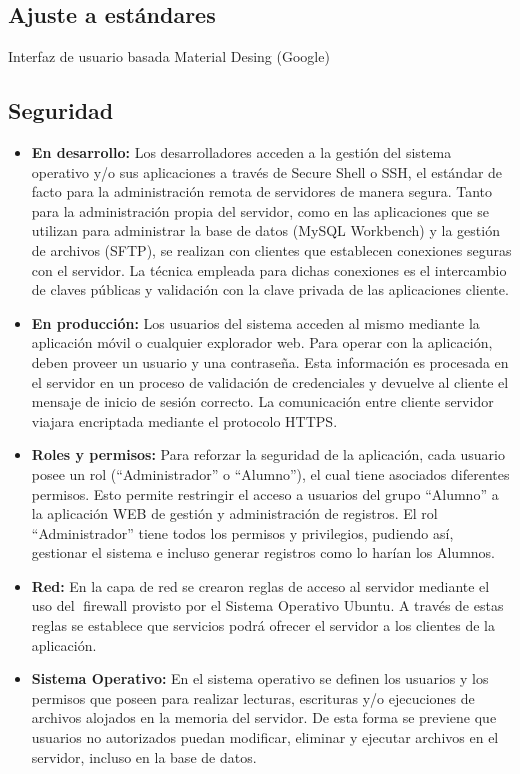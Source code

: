     \subsection{Ajuste a estándares} Interfaz de usuario basada Material Desing (Google)

    \subsection{Seguridad} 
      \begin{itemize}
        
        \item \textbf{En desarrollo:} Los desarrolladores acceden a la gestión del sistema operativo y/o sus aplicaciones a través de Secure Shell o SSH, el estándar de facto para la administración remota de servidores de manera segura. Tanto para la administración propia del servidor, como en las aplicaciones que se utilizan para administrar la base de datos (MySQL Workbench) y la gestión de archivos (SFTP), se realizan con clientes que establecen conexiones seguras con el servidor. La técnica empleada para dichas conexiones es el intercambio de claves públicas y validación con la clave privada de las aplicaciones cliente.
        \item \textbf{En producción:} Los usuarios del sistema acceden al mismo mediante la aplicación móvil o cualquier explorador web. Para operar con la aplicación, deben proveer un usuario y una contraseña. Esta información es procesada en el servidor en un proceso de validación de credenciales y devuelve al cliente el mensaje de inicio de sesión correcto. La comunicación entre cliente servidor viajara encriptada mediante el protocolo HTTPS.
        \item \textbf{Roles y permisos:} Para reforzar la seguridad de la aplicación, cada usuario posee un rol (``Administrador'' o ``Alumno''), el cual tiene asociados diferentes permisos. Esto permite restringir el acceso a usuarios del grupo ``Alumno'' a la aplicación WEB de gestión y administración de registros. El rol ``Administrador'' tiene todos los permisos y privilegios, pudiendo así, gestionar el sistema e incluso generar registros como lo harían los Alumnos.
        \item \textbf{Red:} En la capa de red se crearon reglas de acceso al servidor mediante el uso del firewall provisto por el Sistema Operativo Ubuntu. A través de estas reglas se establece que servicios podrá ofrecer el servidor a los clientes de la aplicación.
        \item \textbf{Sistema Operativo:} En el sistema operativo se definen los usuarios y los permisos que poseen para realizar lecturas, escrituras y/o ejecuciones de archivos alojados en la memoria del servidor. De esta forma se previene que usuarios no autorizados puedan modificar, eliminar y ejecutar archivos en el servidor, incluso en la base de datos.

\end{itemize}
